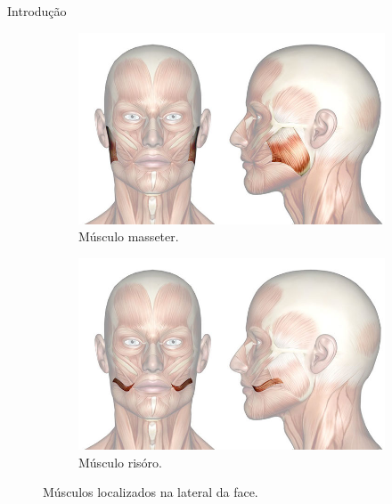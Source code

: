 \begin{chapter}{Introdução}
\begin{figure}
\centering
\begin{subfigure}{.4\textwidth}
  \centering
  \includegraphics[width=1\linewidth, height=0.2\textheight]{fig/masseter}
  \caption{Músculo masseter.}
  \label{fig:masseter}
\end{subfigure}%
\begin{subfigure}{0.4\textwidth}
  \centering
  \includegraphics[width=1\linewidth, height=0.2\textheight]{fig/risorio}
  \caption{Músculo risóro.}
  \label{fig:risorio}
\end{subfigure}
\caption{Músculos localizados na lateral da face.}
\label{fig:test}
\end{figure}


\end{chapter}
